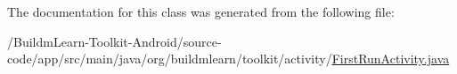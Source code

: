 The documentation for this class was generated from the following file\-:\begin{DoxyCompactItemize}
\item 
/\-Buildm\-Learn-\/\-Toolkit-\/\-Android/source-\/code/app/src/main/java/org/buildmlearn/toolkit/activity/\hyperlink{FirstRunActivity_8java}{First\-Run\-Activity.\-java}\end{DoxyCompactItemize}
